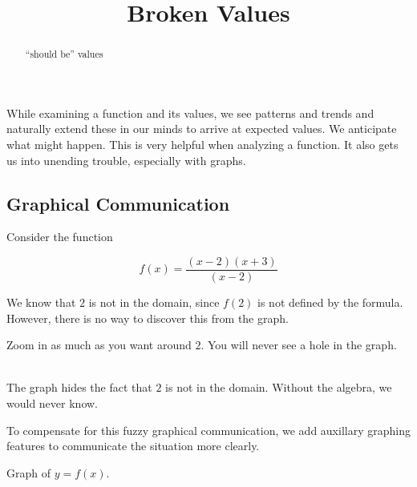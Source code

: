 \documentclass{ximera}
\title{Broken Values}
\begin{document}
\begin{abstract}
``should be'' values
\end{abstract}
\maketitle






While examining a function and its values, we see patterns and trends and naturally extend these in our minds to arrive at expected values. We anticipate what might happen.  This is very helpful when analyzing a function. It also gets us into unending trouble, especially with graphs.






\subsection{Graphical Communication}


Consider the function 

\[ f(x) = \frac{(x-2)(x+3)}{(x-2)} \]

We know that $2$ is not in the domain, since $f(2)$ is not defined  by the formula.  However, there is no way to discover this from the graph.


Zoom in as much as you want around $2$. You will never see a hole in the graph.   \\
[ \textbf{Hint:} a point is a $0$-dimensional object. ] \\

\begin{center}
\end{center}

The graph hides the fact that $2$ is not in the domain.  Without the algebra, we would never know.

To compensate for this fuzzy graphical communication, we add auxillary graphing features to communicate the situation more clearly.



Graph of $y = f(x)$.
\end{document}
